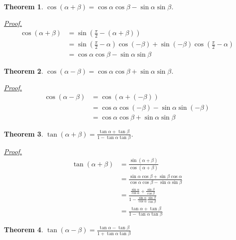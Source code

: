 \documentclass[12pt]{article}
\newtheorem*{theorem}{Theorem}
\renewenvironment{proof}[1][Proof]{\begin{snugshade*} \underline{\textit{{#1}.}}\\}{\hfill \qedsymbol \end{snugshade*}}
\begin{document}
    \begin{theorem}
        $\cos(\alpha+\beta)=\cos{\alpha}\cos{\beta}-\sin{\alpha}\sin{\beta}$.
    \end{theorem}

    \begin{proof}
        \begin{align*}
            \cos(\alpha+\beta)&=\sin(\frac{\pi}{2}-(\alpha+\beta))\\&=\sin(\frac{\pi}{2}-\alpha)\cos(-\beta)+\sin(-\beta)\cos(\frac{\pi}{2}-\alpha)\\&=\cos{\alpha}\cos{\beta}-\sin{\alpha}\sin{\beta}
        \end{align*}
    \end{proof}

    \begin{theorem}
        $\cos(\alpha-\beta)=\cos{\alpha}\cos{\beta}+\sin{\alpha}\sin{\beta}$.
    \end{theorem}

    \begin{proof}
        \begin{align*}
            \cos(\alpha-\beta)&=\cos(\alpha+(-\beta))\\&=\cos{\alpha}\cos(-\beta)-\sin{\alpha}\sin(-\beta)\\&=\cos{\alpha}\cos{\beta}+\sin{\alpha}\sin{\beta}
        \end{align*}
    \end{proof}

    \begin{theorem}
        $\tan(\alpha+\beta)=\frac{\tan{\alpha}+\tan{\beta}}{1-\tan{\alpha}\tan{\beta}}$.
    \end{theorem}

    \begin{proof}
        \begin{align*}
            \tan(\alpha+\beta)&=\frac{\sin(\alpha+\beta)}{\cos(\alpha+\beta)}\\&=\frac{\sin{\alpha}\cos{\beta}+\sin{\beta}\cos{\alpha}}{\cos{\alpha}\cos{\beta}-\sin{\alpha}\sin{\beta}}\\&=\frac{\frac{\sin{\alpha}}{\cos{\alpha}}+\frac{\sin{\beta}}{\cos{\beta}}}{1-\frac{\sin{\alpha}}{\cos{\alpha}}\frac{\sin{\beta}}{\cos{\beta}}}\\&=\frac{\tan{\alpha}+\tan{\beta}}{1-\tan{\alpha}\tan{\beta}}
        \end{align*}
    \end{proof}

    \begin{theorem}
        $\tan(\alpha-\beta)=\frac{\tan{\alpha}-\tan{\beta}}{1+\tan{\alpha}\tan{\beta}}$
    \end{theorem}
\end{document}
